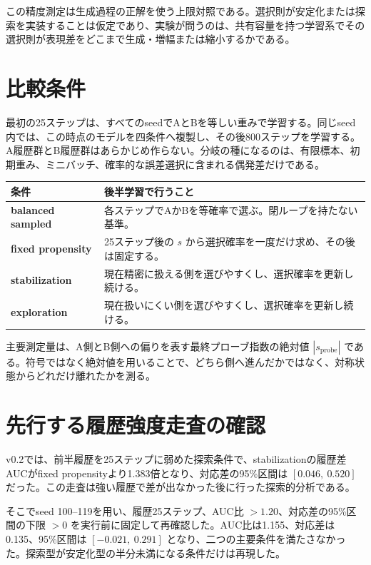 \documentclass[11pt,a4paper]{ltjsarticle}
\begin{document}
この精度測定は生成過程の正解を使う上限対照である。選択則が安定化または探索を実装することは仮定であり、実験が問うのは、共有容量を持つ学習系でその選択則が表現差をどこまで生成・増幅または縮小するかである。

\section{比較条件}

最初の25ステップは、すべてのseedでAとBを等しい重みで学習する。同じseed内では、この時点のモデルを四条件へ複製し、その後800ステップを学習する。A履歴群とB履歴群はあらかじめ作らない。分岐の種になるのは、有限標本、初期重み、ミニバッチ、確率的な誤差選択に含まれる偶発差だけである。

\begin{table}[ht]
\centering
\begin{tabularx}{0.98\linewidth}{>{\bfseries}lX}
\toprule
条件 & 後半学習で行うこと \\
\midrule
balanced sampled & 各ステップでAかBを等確率で選ぶ。閉ループを持たない基準。\\
fixed propensity & 25ステップ後の $s$ から選択確率を一度だけ求め、その後は固定する。\\
stabilization & 現在精密に扱える側を選びやすくし、選択確率を更新し続ける。\\
exploration & 現在扱いにくい側を選びやすくし、選択確率を更新し続ける。\\
\bottomrule
\end{tabularx}
\end{table}

主要測定量は、A側とB側への偏りを表す最終プローブ指数の絶対値 $|s_{\mathrm{probe}}|$ である。符号ではなく絶対値を用いることで、どちら側へ進んだかではなく、対称状態からどれだけ離れたかを測る。

\section{先行する履歴強度走査の確認}

v0.2では、前半履歴を25ステップに弱めた探索条件で、stabilizationの履歴差AUCがfixed propensityより1.383倍となり、対応差の95\%区間は $[0.046,\ 0.520]$ だった。この走査は強い履歴で差が出なかった後に行った探索的分析である。

そこでseed 100--119を用い、履歴25ステップ、AUC比 $>1.20$、対応差の95\%区間の下限 $>0$ を実行前に固定して再確認した。AUC比は1.155、対応差は0.135、95\%区間は $[-0.021,\ 0.291]$ となり、二つの主要条件を満たさなかった。探索型が安定化型の半分未満になる条件だけは再現した。
\end{document}
